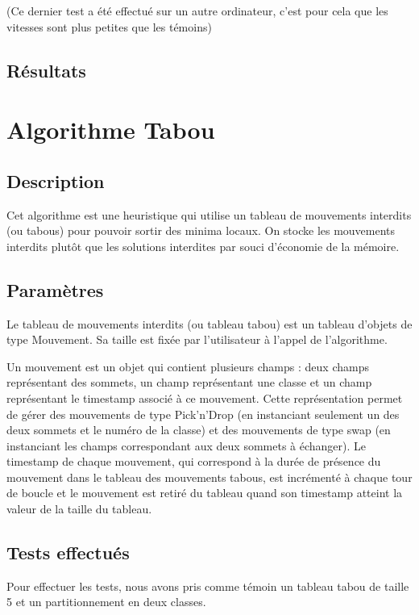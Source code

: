 \documentclass[12pt]{article}
\begin{document}
\bigskip 
(Ce dernier test a été effectué sur un autre ordinateur, c’est pour cela que les vitesses sont plus petites que les témoins)

\subsection{Résultats}


\newpage

\section{Algorithme Tabou}
\subsection{Description}
Cet algorithme est une heuristique qui utilise un tableau de mouvements interdits (ou tabous) pour pouvoir sortir des minima locaux. On stocke les mouvements interdits plutôt que les solutions interdites par souci d’économie de la mémoire.

\subsection{Paramètres}
Le tableau de mouvements interdits (ou tableau tabou) est un tableau d’objets de type Mouvement. Sa taille est fixée par l’utilisateur à l’appel de l’algorithme.

Un mouvement est un objet qui contient plusieurs champs : deux champs représentant des sommets, un champ représentant une classe et un champ représentant le timestamp associé à ce mouvement. Cette représentation permet de gérer des mouvements de type Pick’n’Drop (en instanciant seulement un des deux sommets et le numéro de la classe) et des mouvements de type swap (en instanciant les champs correspondant aux deux sommets à échanger).
Le timestamp de chaque mouvement, qui correspond à la durée de présence du mouvement dans le tableau des mouvements tabous, est incrémenté à chaque tour de boucle et le mouvement est retiré du tableau quand son timestamp atteint la valeur de la taille du tableau.

\subsection{Tests effectués}
Pour effectuer les tests, nous avons pris comme témoin un tableau tabou de taille 5 et un partitionnement en deux classes.
\end{document}
